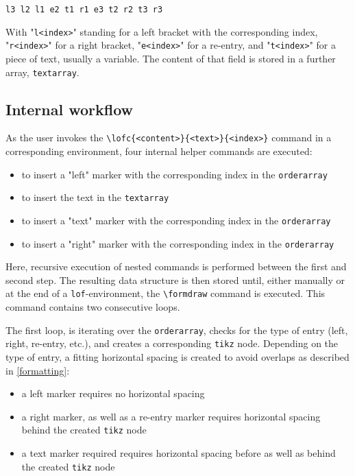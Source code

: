 \documentclass[12pt]{article}
\begin{document}
\begin{lawofforms}
	\formdraw \equiv 
	\texttt{l3 l2 l1 e2 t1 r1 e3 t2 r2 t3 r3}
\end{lawofforms}

With "\texttt{l<index>}" standing for a left bracket with the corresponding index, "\texttt{r<index>}" for a right bracket, "\texttt{e<index>}" for a re-entry, and "\texttt{t<index>}" for a piece of text, usually a variable. The content of that field is stored in a further array, \texttt{textarray}. 

\subsection{Internal workflow}\label{internal}

As the user invokes the \texttt{\textbackslash lofc\{<content>\}\{<text>\}\{<index>\}} command in a corresponding environment, four internal helper commands are executed:

\begin{itemize}
	\item to insert a "left" marker with the corresponding index in the \texttt{orderarray}
	\item to insert the text in the \texttt{textarray}
	\item to insert a "text" marker with the corresponding index in the \texttt{orderarray}
	\item to insert a "right" marker with the corresponding index  in the \texttt{orderarray}
\end{itemize}

Here, recursive execution of nested commands is performed between the first and second step. The resulting data structure is then stored until, either manually or at the end of a \texttt{lof}-environment, the \texttt{\textbackslash formdraw} command is executed. This command contains two consecutive loops.

The first loop, is iterating over the \texttt{orderarray}, checks for the type of entry (left, right, re-entry, etc.), and creates a corresponding \texttt{tikz}\cite{tikz} node. Depending on the type of entry, a fitting horizontal spacing is created to avoid overlaps as described in \ref{formatting}:

\begin{itemize}
	\item a left marker requires no horizontal spacing
	\item a right marker, as well as a re-entry marker requires horizontal spacing behind the created \texttt{tikz}\cite{tikz} node
	\item a text marker required requires horizontal spacing before as well as behind the created \texttt{tikz}\cite{tikz} node
\end{itemize}
\end{document}
